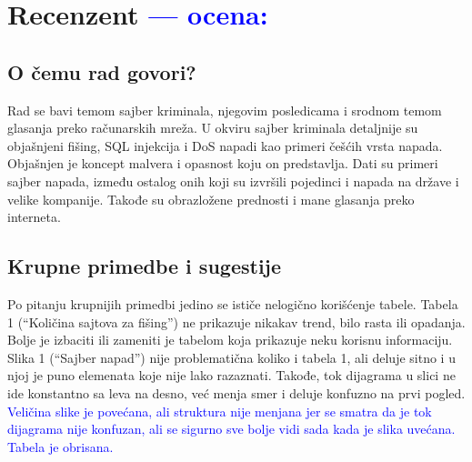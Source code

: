 \documentclass[a4paper]{report}
\newcommand{\odgovor}[1]{\textcolor{blue}{#1}}
\begin{document}
\chapter{Recenzent \odgovor{--- ocena:} }


\section{O čemu rad govori?}

Rad se bavi temom sajber kriminala, njegovim posledicama i srodnom temom glasanja preko računarskih mreža. U okviru sajber kriminala detaljnije su objašnjeni fišing, SQL injekcija i DoS napadi kao primeri češćih vrsta napada. Objašnjen je koncept malvera i opasnost koju on predstavlja. Dati su primeri sajber napada, između ostalog onih koji su izvršili pojedinci i napada na države i velike kompanije. Takođe su obrazložene prednosti i mane glasanja preko interneta.

\section{Krupne primedbe i sugestije}

Po pitanju krupnijih primedbi jedino se ističe nelogično korišćenje tabele.
Tabela 1 (``Količina sajtova za fišing'') ne prikazuje nikakav trend, bilo rasta ili opadanja. Bolje je izbaciti ili zameniti je tabelom koja prikazuje neku korisnu informaciju. Slika 1 (``Sajber napad'') nije problematična koliko i tabela 1, ali deluje sitno i u njoj je puno elemenata koje nije lako razaznati. Takođe, tok dijagrama u slici ne ide konstantno sa leva na desno, već menja smer i deluje konfuzno na prvi pogled.\\
\odgovor {Veličina slike je povećana, ali struktura nije menjana jer se smatra da je tok dijagrama nije konfuzan, ali se sigurno sve bolje vidi sada kada je slika uvećana. Tabela je obrisana.}
\end{document}
